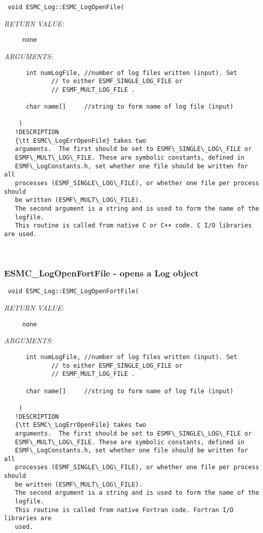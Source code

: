   
\begin{verbatim} 
 void ESMC_Log::ESMC_LogOpenFile(\end{verbatim}{\em RETURN VALUE:}
\begin{verbatim}     none\end{verbatim}{\em ARGUMENTS:}
\begin{verbatim} 
      int numLogFile, //number of log files written (input). Set
 		     // to either ESMF_SINGLE_LOG_FILE or
 		     // ESMF_MULT_LOG_FILE .
 
      char name[]     //string to form name of log file (input)
 
    )
   !DESCRIPTION
   {\tt ESMC\_LogErrOpenFile} takes two
   arguments.  The first should be set to ESMF\_SINGLE\_LOG\_FILE or
   ESMF\_MULT\_LOG\_FILE. These are symbolic constants, defined in
   ESMF\_LogConstants.h, set whether one file should be written for all 
   processes (ESMF_SINGLE\_LOG\_FILE), or whether one file per process should
   be written (ESMF\_MULT\_LOG\_FILE).
   The second argument is a string and is used to form the name of the
   logfile.
   This routine is called from native C or C++ code. C I/O libraries are used.\end{verbatim}
 
 
\mbox{}\hrulefill\ 
 
\subsubsection [ESMC\_LogOpenFortFile] {ESMC\_LogOpenFortFile - opens a Log object}


  
\begin{verbatim} 
 void ESMC_Log::ESMC_LogOpenFortFile(\end{verbatim}{\em RETURN VALUE:}
\begin{verbatim}     none\end{verbatim}{\em ARGUMENTS:}
\begin{verbatim} 
      int numLogFile, //number of log files written (input). Set
 		     // to either ESMF_SINGLE_LOG_FILE or
 		     // ESMF_MULT_LOG_FILE .
 
      char name[]     //string to form name of log file (input)
 
    )
   !DESCRIPTION
   {\tt ESMC\_LogErrOpenFile} takes two
   arguments.  The first should be set to ESMF\_SINGLE\_LOG\_FILE or
   ESMF\_MULT\_LOG\_FILE. These are symbolic constants, defined in
   ESMF\_LogConstants.h, set whether one file should be written for all 
   processes (ESMF_SINGLE\_LOG\_FILE), or whether one file per process should
   be written (ESMF\_MULT\_LOG\_FILE).
   The second argument is a string and is used to form the name of the
   logfile.
   This routine is called from native Fortran code. Fortran I/O libraries are
   used.\end{verbatim}
 
